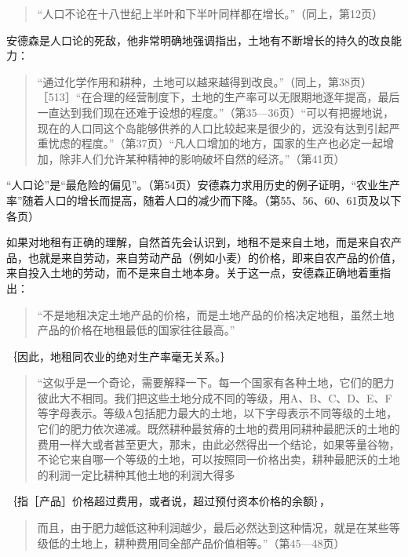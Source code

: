\begin{quote}{“人口不论在十八世纪上半叶和下半叶同样都在增长。”（同上，第12页）}\end{quote}

安德森是人口论的死敌，他非常明确地强调指出，土地有不断增长的持久的改良能力：

\begin{quote}{“通过化学作用和耕种，土地可以越来越得到改良。”（同上，第38页）［513］“在合理的经营制度下，土地的生产率可以无限期地逐年提高，最后一直达到我们现在还难于设想的程度。”（第35—36页）“可以有把握地说，现在的人口同这个岛能够供养的人口比较起来是很少的，远没有达到引起严重忧虑的程度。”（第37页）“凡人口增加的地方，国家的生产也必定一起增加，除非人们允许某种精神的影响破坏自然的经济。”（第41页）}\end{quote}

“人口论”是“最危险的偏见”。（第54页）安德森力求用历史的例子证明，“农业生产率”随着人口的增长而提高，随着人口的减少而下降。（第55、56、60、61页及以下各页）

如果对地租有正确的理解，自然首先会认识到，地租不是来自土地，而是来自农产品，也就是来自劳动，来自劳动产品（例如小麦）的价格，即来自农产品的价值，来自投入土地的劳动，而不是来自土地本身。关于这一点，安德森正确地着重指出：

\begin{quote}{“不是地租决定土地产品的价格，而是土地产品的价格决定地租，虽然土地产品的价格在地租最低的国家往往最高。”}\end{quote}

｛因此，地租同农业的绝对生产率毫无关系。｝

\begin{quote}{“这似乎是一个奇论，需要解释一下。每一个国家有各种土地，它们的肥力彼此大不相同。我们把这些土地分成不同的等级，用A、B、C、D、E、F等字母表示。等级A包括肥力最大的土地，以下字母表示不同等级的土地，它们的肥力依次递减。既然耕种最贫瘠的土地的费用同耕种最肥沃的土地的费用一样大或者甚至更大，那末，由此必然得出一个结论，如果等量谷物，不论它来自哪一个等级的土地，可以按照同一价格出卖，耕种最肥沃的土地的利润一定比耕种其他土地的利润大得多}\end{quote}

｛指［产品］价格超过费用，或者说，超过预付资本价格的余额｝，

\begin{quote}{而且，由于肥力越低这种利润越少，最后必然达到这种情况，就是在某些等级低的土地上，耕种费用同全部产品价值相等。”（第45—48页）}\end{quote}

